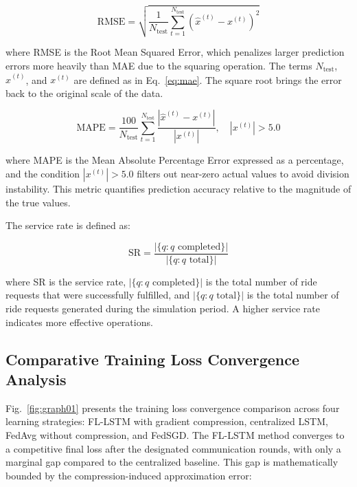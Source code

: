 \documentclass[journal]{IEEEtran}
\begin{document}
\begin{equation}
\text{RMSE} = \sqrt{\frac{1}{N_{\text{test}}} \sum_{t=1}^{N_{\text{test}}} \left(\hat{x}^{(t)} - x^{(t)}\right)^2}
\label{eq:rmse}
\end{equation}

\noindent where RMSE is the Root Mean Squared Error, which penalizes larger prediction errors more heavily than MAE due to the squaring operation. The terms $N_{\text{test}}$, $\hat{x}^{(t)}$, and $x^{(t)}$ are defined as in Eq.~\ref{eq:mae}. The square root brings the error back to the original scale of the data.

\begin{equation}
\text{MAPE} = \frac{100}{N_{\text{test}}} \sum_{t=1}^{N_{\text{test}}} \frac{\left|\hat{x}^{(t)} - x^{(t)}\right|}{|x^{(t)}|},\quad |x^{(t)}| > 5.0
\label{eq:mape}
\end{equation}

\noindent where MAPE is the Mean Absolute Percentage Error expressed as a percentage, and the condition $|x^{(t)}| > 5.0$ filters out near-zero actual values to avoid division instability. This metric quantifies prediction accuracy relative to the magnitude of the true values.

The service rate is defined as:

\begin{equation}
\text{SR} = \frac{|\{q: q \text{ completed}\}|}{|\{q: q \text{ total}\}|}
\label{eq:service_rate}
\end{equation}

\noindent where SR is the service rate, $|\{q: q \text{ completed}\}|$ is the total number of ride requests that were successfully fulfilled, and $|\{q: q \text{ total}\}|$ is the total number of ride requests generated during the simulation period. A higher service rate indicates more effective operations.

\subsection{Comparative Training Loss Convergence Analysis}

Fig.~\ref{fig:graph01} presents the training loss convergence comparison across four learning strategies: FL-LSTM with gradient compression, centralized LSTM, FedAvg without compression, and FedSGD. The FL-LSTM method converges to a competitive final loss after the designated communication rounds, with only a marginal gap compared to the centralized baseline. This gap is mathematically bounded by the compression-induced approximation error:
\end{document}
